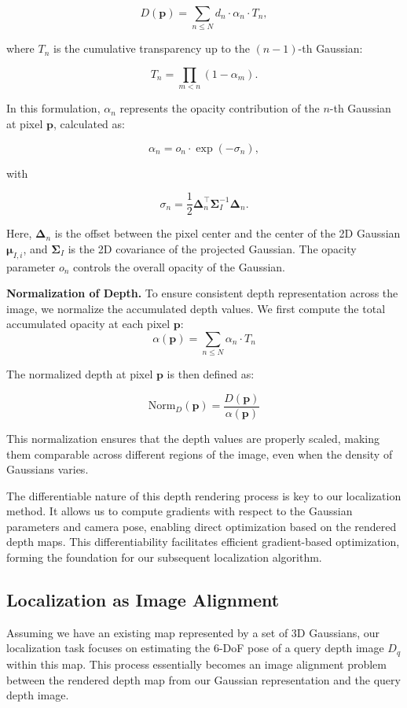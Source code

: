 \documentclass[twocolumn]{article}
\begin{document}
\[D(\mathbf{p}) = \sum_{n \leq N} d_n \cdot \alpha_n \cdot T_n,\]

where \(T_n\) is the cumulative transparency up to the \((n-1)\)-th
Gaussian:

\[T_n = \prod_{m < n} (1 - \alpha_m).\]

In this formulation, \(\alpha_n\) represents the opacity contribution of
the \(n\)-th Gaussian at pixel \(\mathbf{p}\), calculated as:

\[\alpha_n = o_n \cdot \exp(-\sigma_n),\]

with

\[\sigma_n = \frac{1}{2} \boldsymbol{\Delta}_n^\top \boldsymbol{\Sigma}_I^{-1} \boldsymbol{\Delta}_n.\]

Here, \(\boldsymbol{\Delta}_n\) is the offset between the pixel center
and the center of the 2D Gaussian \(\boldsymbol{\mu}_{I,i}\), and
\(\boldsymbol{\Sigma}_I\) is the 2D covariance of the projected
Gaussian. The opacity parameter \(o_n\) controls the overall opacity of
the Gaussian.

\textbf{Normalization of Depth.} To ensure consistent depth
representation across the image, we normalize the accumulated depth
values. We first compute the total accumulated opacity at each pixel
\(\mathbf{p}\): \[
\alpha(\mathbf{p}) = \sum_{n \leq N} \alpha_n \cdot T_n
\]

The normalized depth at pixel \(\mathbf{p}\) is then defined as:

\[
\text{Norm}_D(\mathbf{p}) = \frac{D(\mathbf{p})}{\alpha(\mathbf{p})}
\]

This normalization ensures that the depth values are properly scaled,
making them comparable across different regions of the image, even when
the density of Gaussians varies.

The differentiable nature of this depth rendering process is key to our
localization method. It allows us to compute gradients with respect to
the Gaussian parameters and camera pose, enabling direct optimization
based on the rendered depth maps. This differentiability facilitates
efficient gradient-based optimization, forming the foundation for our
subsequent localization algorithm.

\subsection{Localization as Image
Alignment}\label{localization-as-image-alignment}

Assuming we have an existing map represented by a set of 3D Gaussians,
our localization task focuses on estimating the 6-DoF pose of a query
depth image \(D_q\) within this map. This process essentially becomes an
image alignment problem between the rendered depth map from our Gaussian
representation and the query depth image.
\end{document}
